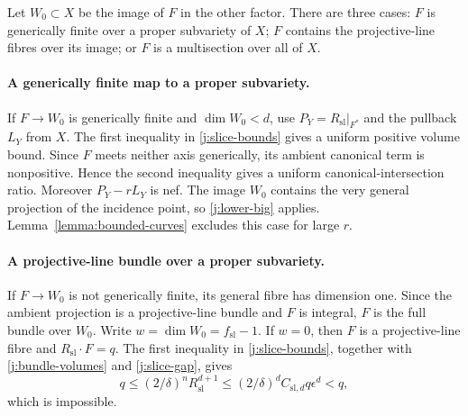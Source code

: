 \documentclass[12pt,a4paper,psamsfonts]{amsart}
\theoremstyle{definition}
\theoremstyle{plain}
\begin{document}
Let $W_0\subset X$ be the image of $F$ in the other factor.
There are three cases: $F$ is generically finite over a proper
subvariety of $X$; $F$ contains the projective-line fibres over its
image; or $F$ is a multisection over all of $X$.

\paragraph{A generically finite map to a proper subvariety.}
If $F\to W_0$ is generically finite and $\dim W_0<d$, use
$P_Y=R_{\mathrm{sl}}|_{F^*}$ and the pullback $L_Y$ from $X$.
The first inequality in \eqref{j:slice-bounds} gives a uniform
positive volume bound. Since $F$ meets neither axis generically,
its ambient canonical term is nonpositive. Hence the second
inequality gives a uniform canonical-intersection ratio.
Moreover $P_Y-rL_Y$ is nef. The image $W_0$ contains the very
general projection of the incidence point, so
\eqref{j:lower-big} applies. Lemma~\ref{lemma:bounded-curves}
excludes this case for large $r$.

\paragraph{A projective-line bundle over a proper subvariety.}
If $F\to W_0$ is not generically finite, its general fibre has
dimension one. Since the ambient projection is a projective-line
bundle and $F$ is integral, $F$ is the full bundle over $W_0$.
Write $w=\dim W_0=f_{\mathrm{sl}}-1$.
If $w=0$, then $F$ is a projective-line fibre and
$R_{\mathrm{sl}}\cdot F=q$. The first inequality in
\eqref{j:slice-bounds}, together with
\eqref{j:bundle-volumes} and \eqref{j:slice-gap}, gives
\[
 q\le(2/\delta)^nR_{\mathrm{sl}}^{d+1}
   \le(2/\delta)^d C_{\mathrm{sl},d}q\epsilon^d<q,
\]
which is impossible.
\end{document}
